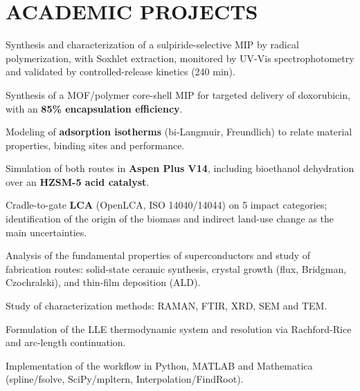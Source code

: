 \documentclass[10pt]{article}
\begin{document}
\section{ACADEMIC PROJECTS}
\begin{bul}
\item Synthesis and characterization of a sulpiride-selective MIP by radical polymerization, with Soxhlet extraction, monitored by UV-Vis spectrophotometry and validated by controlled-release kinetics (240 min).
\item Synthesis of a MOF/polymer core-shell MIP for targeted delivery of doxorubicin, with an \textbf{85\% encapsulation efficiency}.
\item Modeling of \textbf{adsorption isotherms} (bi-Langmuir, Freundlich) to relate material properties, binding sites and performance.
\end{bul}
\begin{bul}
\item Simulation of both routes in \textbf{Aspen Plus V14}, including bioethanol dehydration over an \textbf{HZSM-5 acid catalyst}.
\item Cradle-to-gate \textbf{LCA} (OpenLCA, ISO 14040/14044) on 5 impact categories; identification of the origin of the biomass and indirect land-use change as the main uncertainties.
\end{bul}
\begin{bul}
\item Analysis of the fundamental properties of superconductors and study of fabrication routes: solid-state ceramic synthesis, crystal growth (flux, Bridgman, Czochralski), and thin-film deposition (ALD).
\item Study of characterization methods: RAMAN, FTIR, XRD, SEM and TEM.
\end{bul}
\begin{bul}
\item Formulation of the LLE thermodynamic system and resolution via Rachford-Rice and arc-length continuation.
\item Implementation of the workflow in Python, MATLAB and Mathematica (spline/fsolve, SciPy/mpltern, Interpolation/FindRoot).
\end{bul}
\end{document}
